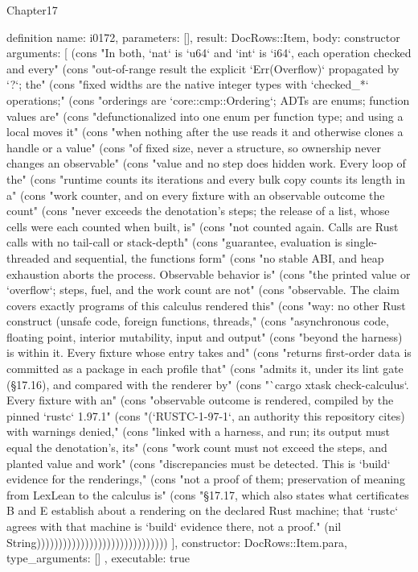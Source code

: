 \begin{lexlean}{Chapter17}
\begin{semanticmodule}
definition{
  name: i0172,
  parameters: [],
  result: DocRows::Item,
  body: constructor{
    arguments: [
      (cons "In both, `nat` is `u64` and `int` is `i64`, each operation checked and every" (cons "out-of-range result the explicit `Err(Overflow)` propagated by `?`; the" (cons "fixed widths are the native integer types with `checked_*` operations;" (cons "orderings are `core::cmp::Ordering`; ADTs are enums; function values are" (cons "defunctionalized into one enum per function type; and using a local moves it" (cons "when nothing after the use reads it and otherwise clones a handle or a value" (cons "of fixed size, never a structure, so ownership never changes an observable" (cons "value and no step does hidden work. Every loop of the" (cons "runtime counts its iterations and every bulk copy counts its length in a" (cons "work counter, and on every fixture with an observable outcome the count" (cons "never exceeds the denotation's steps; the release of a list, whose cells were each counted when built, is" (cons "not counted again. Calls are Rust calls with no tail-call or stack-depth" (cons "guarantee, evaluation is single-threaded and sequential, the functions form" (cons "no stable ABI, and heap exhaustion aborts the process. Observable behavior is" (cons "the printed value or `overflow`; steps, fuel, and the work count are not" (cons "observable. The claim covers exactly programs of this calculus rendered this" (cons "way: no other Rust construct (unsafe code, foreign functions, threads," (cons "asynchronous code, floating point, interior mutability, input and output" (cons "beyond the harness) is within it. Every fixture whose entry takes and" (cons "returns first-order data is committed as a package in each profile that" (cons "admits it, under its lint gate (§17.16), and compared with the renderer by" (cons "`cargo xtask check-calculus`. Every fixture with an" (cons "observable outcome is rendered, compiled by the pinned `rustc` 1.97.1" (cons "(`RUSTC-1-97-1`, an authority this repository cites) with warnings denied," (cons "linked with a harness, and run; its output must equal the denotation's, its" (cons "work count must not exceed the steps, and planted value and work" (cons "discrepancies must be detected. This is `build` evidence for the renderings," (cons "not a proof of them; preservation of meaning from LexLean to the calculus is" (cons "§17.17, which also states what certificates B and E establish about a rendering on the declared Rust machine; that `rustc` agrees with that machine is `build` evidence there, not a proof." (nil String))))))))))))))))))))))))))))))
    ],
    constructor: DocRows::Item.para,
    type_arguments: []
  },
  executable: true
}


\end{semanticmodule}
\end{lexlean}
